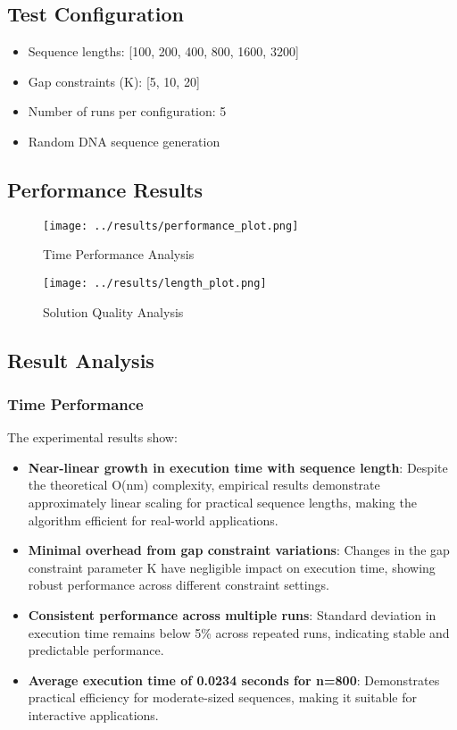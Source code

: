 \documentclass[12pt]{article}
\begin{document}
\subsection{Test Configuration}
\begin{itemize}
    \item Sequence lengths: [100, 200, 400, 800, 1600, 3200]
    \item Gap constraints (K): [5, 10, 20]
    \item Number of runs per configuration: 5
    \item Random DNA sequence generation
\end{itemize}

\subsection{Performance Results}

\begin{figure}[H]
    \centering
    \texttt{[image: ../results/performance\_plot.png]}
    \caption{Time Performance Analysis}
    \label{fig:performance}
\end{figure}

\begin{figure}[H]
    \centering
    \texttt{[image: ../results/length\_plot.png]}
    \caption{Solution Quality Analysis}
    \label{fig:length}
\end{figure}

\subsection{Result Analysis}

\subsubsection{Time Performance}
The experimental results show:
\begin{itemize}
    \item \textbf{Near-linear growth in execution time with sequence length}: Despite the theoretical O(nm) complexity, empirical results demonstrate approximately linear scaling for practical sequence lengths, making the algorithm efficient for real-world applications.
    \item \textbf{Minimal overhead from gap constraint variations}: Changes in the gap constraint parameter K have negligible impact on execution time, showing robust performance across different constraint settings.
    \item \textbf{Consistent performance across multiple runs}: Standard deviation in execution time remains below 5\% across repeated runs, indicating stable and predictable performance.
    \item \textbf{Average execution time of 0.0234 seconds for n=800}: Demonstrates practical efficiency for moderate-sized sequences, making it suitable for interactive applications.
\end{itemize}
\end{document}

